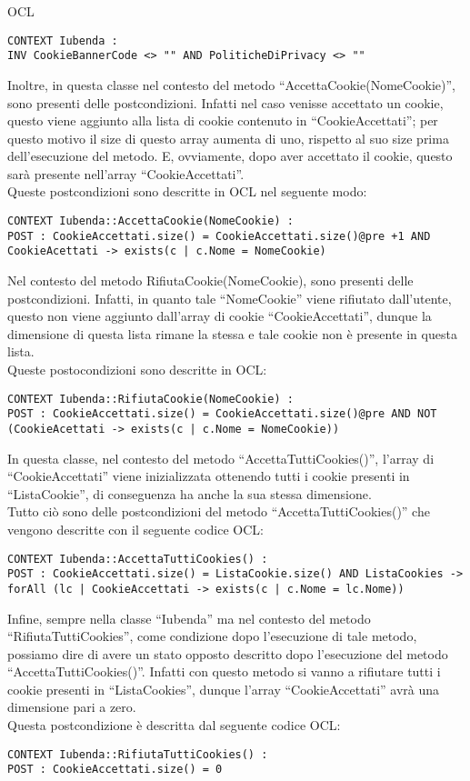 \begin{listaPersonale}{OCL}
    \begin{lstlisting}
CONTEXT Iubenda :
INV CookieBannerCode <> "" AND PoliticheDiPrivacy <> ""
    \end{lstlisting}
    Inoltre, in questa classe nel contesto del metodo “AccettaCookie(NomeCookie)”, sono presenti delle postcondizioni. Infatti nel caso venisse accettato un cookie, questo viene aggiunto alla lista di cookie contenuto in “CookieAccettati”; per questo motivo il size di questo array aumenta di uno, rispetto al suo size prima dell’esecuzione del metodo. E, ovviamente, dopo aver accettato il cookie, questo sarà presente nell’array “CookieAccettati”. \\
    Queste postcondizioni sono descritte in OCL nel seguente modo:
    \begin{lstlisting}
CONTEXT Iubenda::AccettaCookie(NomeCookie) :
POST : CookieAccettati.size() = CookieAccettati.size()@pre +1 AND CookieAcettati -> exists(c | c.Nome = NomeCookie)
    \end{lstlisting}
    Nel contesto del metodo RifiutaCookie(NomeCookie), sono presenti delle postcondizioni. Infatti, in quanto tale “NomeCookie” viene rifiutato dall’utente, questo non viene aggiunto dall’array di cookie “CookieAccettati”, dunque la dimensione di questa lista rimane la stessa e tale cookie non è presente in questa lista.\\
    Queste postocondizioni sono descritte in OCL:
    \begin{lstlisting}
CONTEXT Iubenda::RifiutaCookie(NomeCookie) :
POST : CookieAccettati.size() = CookieAccettati.size()@pre AND NOT (CookieAcettati -> exists(c | c.Nome = NomeCookie))
    \end{lstlisting}
    In questa classe, nel contesto del metodo “AccettaTuttiCookies()”, l’array di “CookieAccettati” viene inizializzata ottenendo tutti i cookie presenti in “ListaCookie”, di conseguenza ha anche la sua stessa dimensione. \\
    Tutto ciò sono delle postcondizioni del metodo “AccettaTuttiCookies()” che vengono descritte con il seguente codice OCL:
    \begin{lstlisting}
CONTEXT Iubenda::AccettaTuttiCookies() :
POST : CookieAccettati.size() = ListaCookie.size() AND ListaCookies -> forAll (lc | CookieAccettati -> exists(c | c.Nome = lc.Nome))
    \end{lstlisting}
    Infine, sempre nella classe “Iubenda” ma nel contesto del metodo “RifiutaTuttiCookies”, come condizione dopo l’esecuzione di tale metodo, possiamo dire di avere un stato opposto descritto dopo l’esecuzione del metodo “AccettaTuttiCookies()”. Infatti con questo metodo si vanno a rifiutare tutti i cookie presenti in “ListaCookies”, dunque l’array “CookieAccettati” avrà una dimensione pari a zero.\\
    Questa postcondizione è descritta dal seguente codice OCL:
    \begin{lstlisting}
CONTEXT Iubenda::RifiutaTuttiCookies() :
POST : CookieAccettati.size() = 0
    \end{lstlisting}





\end{listaPersonale}
